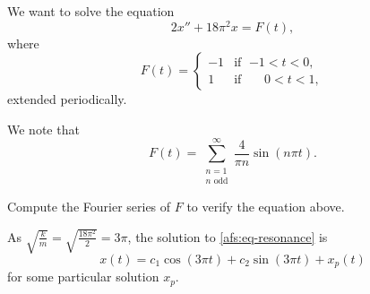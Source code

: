\documentclass{ximera}
\begin{document}
\begin{example}
    We want to solve the equation
    \begin{equation} \label{afs:eq-resonance}
        2 x'' + 18 \pi^2 x = F(t) ,
    \end{equation}
    where
    \begin{equation*}
        F(t) =
        \begin{cases}
            -1 & \text{if } \; {-1} < t < 0 , \\
            1 & \text{if } \; \phantom{-}0 < t < 1 ,
        \end{cases}
    \end{equation*}
    extended periodically. 
\end{example}

\begin{exampleSol}
    We note that
    \begin{equation*}
        F(t) = \sum_{\substack{n=1 \\ n \text{ odd}}}^\infty \frac{4}{\pi n} \sin (n \pi t) . 
    \end{equation*}
    
    \begin{exercise}
        Compute the Fourier series of $F$ to verify the equation above.
    \end{exercise}
    
    As $\sqrt{\frac{k}{m}} = \sqrt{\frac{18\pi^2}{2}} = 3\pi$, the solution to \eqref{afs:eq-resonance} is
    \begin{equation*}
        x(t) = c_1 \cos  (3\pi t) + c_2 \sin (3\pi t) + x_p (t)
    \end{equation*}
    for some particular solution $x_p$.
    

\end{exampleSol}
\end{document}
